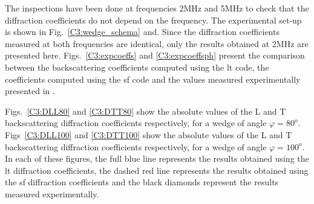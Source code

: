 The inspections have been done at frequencies 2MHz and 5MHz to check that the diffraction coefficients do not depend on the frequency.  The experimental set-up is shown in Fig.~\ref{C3:wedge_schema} and. Since the diffraction coefficients measured at both frequencies are identical, only the results obtained at 2MHz are presented here. Figs.~\ref{C3:expcoeffs} and \ref{C3:expcoeffsph} present the comparison between the backscattering coefficients computed using the \acrshort{lt} code, the coefficients computed using the \acrshort{sf} code and the values measured experimentally presented in \cite{ChapmanBurch}.

Figs.~\ref{C3:DLL80} and \ref{C3:DTT80} show the absolute values of the L and T backscattering diffraction coefficients respectively, for a wedge of angle $\varphi=80^o$. Figs~\ref{C3:DLL100} and \ref{C3:DTT100} show the absolute values of the L and T backscattering diffraction coefficients respectively, for a wedge of angle $\varphi=100^o$. In each of these figures, the full blue line represents the results obtained using the \acrshort{lt} diffraction coefficients, the dashed red line represents the results obtained using the \acrshort{sf} diffraction coefficients and the black diamonds represent the results measured experimentally.

